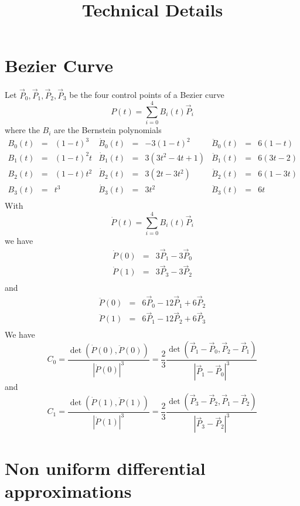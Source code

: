 \documentclass[11pt]{amsart}
\title{Technical Details}
\begin{document}
\maketitle


\section{Bezier Curve}
Let $\vec{P}_0,\vec{P}_1,\vec{P}_2,\vec{P}_3$
be the four control points of a Bezier curve
\[
	P(t) = \sum_{i=0}^4 B_i(t) \vec{P}_i
\]
where the $B_i$ are the Bernstein polynomials
\[
	\begin{array}{rcl|rcl|rcl}
	B_0(t) & = & (1-t)^3  & \dot{B}_0(t) & = & -3(1-t)^2     & \ddot{B}_0(t) & = & 6(1-t)\\
 	B_1(t) & = & (1-t)^2t & \dot{B}_1(t) & = &  3(3t^2-4t+1) & \ddot{B}_1(t) & = & 6(3t-2)\\
	B_2(t) & = & (1-t)t^2 & \dot{B}_2(t) & = &  3(2t-3t^2)   & \ddot{B}_2(t) & = & 6(1-3t)\\
	B_3(t) & = & t^3      & \dot{B}_3(t) & = &  3t^2         & \ddot{B}_3(t) & = & 6t    \\
	\end{array} 
\]
With
\[
	\dot{P}(t) = \sum_{i=0}^4 B_i(t) \vec{P}_i
\]
we have
\[
\begin{array}{rcl}
	\dot{P}(0) & = & 3\vec{P}_1 - 3\vec{P}_0 \\
	\dot{P}(1) & = & 3\vec{P}_3 - 3\vec{P}_2 \\
\end{array}
\]
and
\[
	\begin{array}{rcl}
	\ddot{P}(0) & = & 6\vec{P}_0 - 12 \vec{P}_1 + 6\vec{P}_2\\
	\ddot{P}(1) & = & 6\vec{P}_1 - 12 \vec{P}_2 + 6\vec{P}_3\\
	\end{array}
\]
We have
\[
	C_0 = \dfrac{\det(\dot{P}(0),\ddot{P}(0))}{\left|\dot{P}(0)\right|^3} 
	= \dfrac{2}{3} \dfrac{\det(\vec{P}_1 - \vec{P}_0,\vec{P}_2 - \vec{P}_1)}{\left|\vec{P}_1 - \vec{P}_0\right|^3}
\]
and
\[
	C_1 = \dfrac{\det(\dot{P}(1),\ddot{P}(1))}{\left|\dot{P}(1)\right|^3} 
	= \dfrac{2}{3} \dfrac{\det(\vec{P}_3 - \vec{P}_2,\vec{P}_1 - \vec{P}_2)}{\left|\vec{P}_3 - \vec{P}_2\right|^3}
\]
\section{Non uniform differential approximations}
\end{document}
